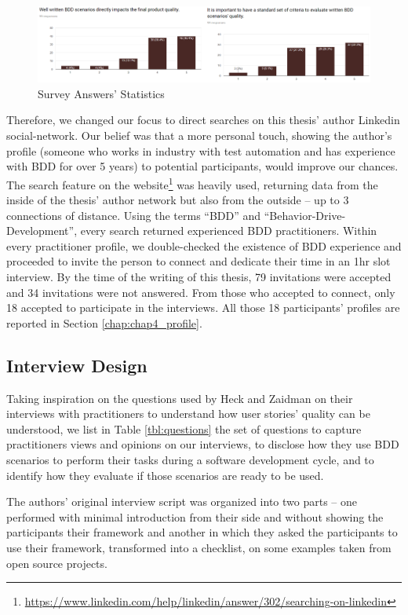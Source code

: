 \begin{figure}[t]
\centering
\includegraphics[width=.9\textwidth]{images/survey_answers}
\caption{Survey Answers' Statistics}
\label{fig:survey_answers}
\end{figure}

Therefore, we changed our focus to direct searches on this thesis' author Linkedin social-network. Our belief was that a more personal touch, showing the author's profile (someone who works in industry with test automation and has experience with BDD for over 5 years) to potential participants, would improve our chances. The search feature on the website\footnote{\url{https://www.linkedin.com/help/linkedin/answer/302/searching-on-linkedin}} was heavily used, returning data from the inside of the thesis' author network but also from the outside -- up to 3 connections of distance. Using the terms ``BDD'' and ``Behavior-Drive-Development'', every search returned experienced BDD practitioners. Within every practitioner profile, we double-checked the existence of BDD experience and proceeded to invite the person to connect and dedicate their time in an 1hr slot interview. By the time of the writing of this thesis, 79 invitations were accepted and 34 invitations were not answered. From those who accepted to connect, only 18 accepted to participate in the interviews. All those 18 participants' profiles are reported in Section \ref{chap:chap4_profile}.

\subsection{Interview Design}

Taking inspiration on the questions used by Heck and Zaidman \cite{Heck_and_Zaidman_2017} on their interviews with practitioners to understand how user stories' quality can be understood, we list in Table \ref{tbl:questions} the set of questions to capture practitioners views and opinions on our interviews, to disclose how they use BDD scenarios to perform their tasks during a software development cycle, and to identify how they evaluate if those scenarios are ready to be used. 

The authors' original interview script \cite{Heck_and_Zaidman_2017} was organized into two parts -- one performed with minimal introduction from their side and without showing the participants their framework and another in which they asked the participants to use their framework, transformed into a checklist, on some examples taken from open source projects. 

